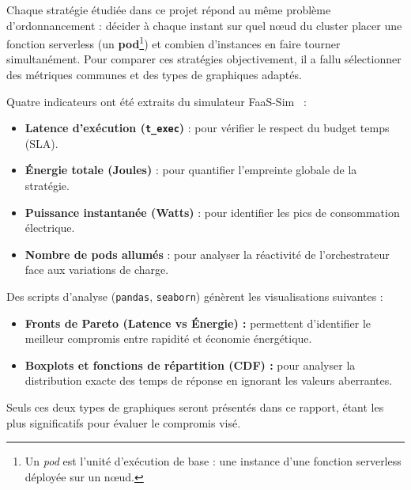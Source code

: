 Chaque stratégie étudiée dans ce projet répond au même problème d'ordonnancement : décider à chaque instant sur quel nœud du cluster placer une fonction serverless (un \textbf{pod}\footnote{Un \textit{pod} est l'unité d'exécution de base : une instance d'une fonction serverless déployée sur un nœud.}) et combien d'instances en faire tourner simultanément. Pour comparer ces stratégies objectivement, il a fallu sélectionner des métriques communes et des types de graphiques adaptés.

Quatre indicateurs ont été extraits du simulateur FaaS-Sim~\cite{philipp_raith_faas} :
\begin{itemize}
    \item \textbf{Latence d'exécution (\texttt{t\_exec})} : pour vérifier le respect du budget temps (SLA).
    \item \textbf{Énergie totale (Joules)} : pour quantifier l'empreinte globale de la stratégie.
    \item \textbf{Puissance instantanée (Watts)} : pour identifier les pics de consommation électrique.
    \item \textbf{Nombre de pods allumés} : pour analyser la réactivité de l'orchestrateur face aux variations de charge.
\end{itemize}

Des scripts d'analyse (\texttt{pandas}, \texttt{seaborn}) génèrent les visualisations suivantes :
\begin{itemize}
    \item \textbf{Fronts de Pareto (Latence vs Énergie) :} permettent d'identifier le meilleur compromis entre rapidité et économie énergétique.
    \item \textbf{Boxplots et fonctions de répartition (CDF) :} pour analyser la distribution exacte des temps de réponse en ignorant les valeurs aberrantes.
\end{itemize}
Seuls ces deux types de graphiques seront présentés dans ce rapport, étant les plus significatifs pour évaluer le compromis visé.
